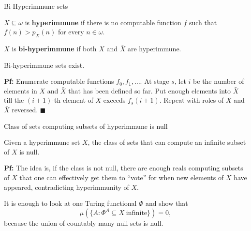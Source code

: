 \begin{frame}{Bi-Hyperimmune sets}
  \begin{define}
    $X\subseteq\omega$ is \textbf{hyperimmune} if there is no computable
    function $f$ such that $f(n)>p_X(n)$ for every $n\in\omega$.
  \end{define}

  \pause
  \begin{define}
    $X$ is \textbf{bi-hyperimmune} if both $X$ and $\bar{X}$ are hyperimmune.
  \end{define}

  \pause
  \begin{thm}
    Bi-hyperimmune sets exist.
  \end{thm}

  \pause
  \vspace{0.5em}
  \textbf{Pf:} Enumerate computable functions $f_0,f_1,\ldots$. At stage
  $s$, let $i$ be the number of elements in $X$ and $\bar{X}$ that has been
  defined so far. Put enough elements into $\bar{X}$ till the $(i+1)$-th
  element of $X$ exceeds $f_s(i+1)$. Repeat with roles of $X$ and $\bar{X}$
  reversed. $\blacksquare$
\end{frame}

\begin{frame}{Class of sets computing subsets of hyperimmune is null}
  \begin{thm}
    \label{thm:bihyper-null}
    Given a hyperimmune set $X$, the class of sets that can compute an
    infinite subset of $X$ is null.
  \end{thm}

  \pause
  \vspace{1em}
  \textbf{Pf:} The idea is, if the class is not null, there are enough
  reals computing subsets of $X$ that one can effectively get them to
  ``vote'' for when new elements of $X$ have appeared, contradicting
  hyperimmunity of $X$.

  \pause
  \vspace{1em}
  It is enough to look at one Turing functional $\Phi$ and show that
  \[\mu(\{A: \Phi^A \subseteq X\; \text{infinite}\}) =0,\]
  because the union of countably many null sets is null.
\end{frame}

